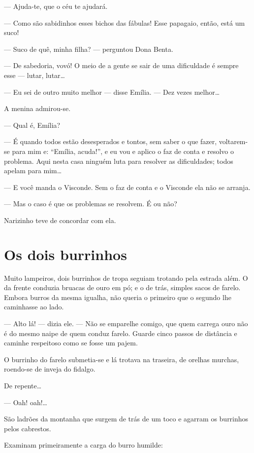 --- Ajuda-te, que o céu te ajudará.

--- Como são sabidinhos esses bichos das fábulas! Esse papagaio, então,
está um suco!

--- Suco de quê, minha filha? --- perguntou Dona Benta.

--- De sabedoria, vovó! O meio de a gente se sair de uma dificuldade é
sempre esse --- lutar, lutar\ldots{}

--- Eu sei de outro muito melhor --- disse Emília. --- Dez vezes
melhor\ldots{}

A menina admirou-se.

--- Qual é, Emília?

--- É quando todos estão desesperados e tontos, sem saber o que fazer,
voltarem-se para mim e: ``Emília, acuda!'', e eu vou e aplico o faz de
conta e resolvo o problema. Aqui nesta casa ninguém luta para resolver
as dificuldades; todos apelam para mim\ldots{}

--- E você manda o Visconde. Sem o faz de conta e o Visconde ela não se
arranja.

--- Mas o caso é que os problemas se resolvem. É ou não?

Narizinho teve de concordar com ela.


\chapter{Os dois burrinhos}

Muito lampeiros, dois burrinhos de tropa seguiam trotando pela estrada
além. O da frente conduzia bruacas de ouro em pó; e o de trás, simples
sacos de farelo. Embora burros da mesma igualha, não queria o primeiro
que o segundo lhe caminhasse ao lado.

--- Alto lá! --- dizia ele. --- Não se emparelhe comigo, que quem
carrega ouro não é do mesmo naipe de quem conduz farelo. Guarde cinco
passos de distância e caminhe respeitoso como se fosse um pajem.

O burrinho do farelo submetia-se e lá trotava na traseira, de orelhas
murchas, roendo-se de inveja do fidalgo.

De repente\ldots{}

--- Oah! oah!\ldots{}

São ladrões da montanha que surgem de trás de um toco e agarram os
burrinhos pelos cabrestos.

Examinam primeiramente a carga do burro humilde:

